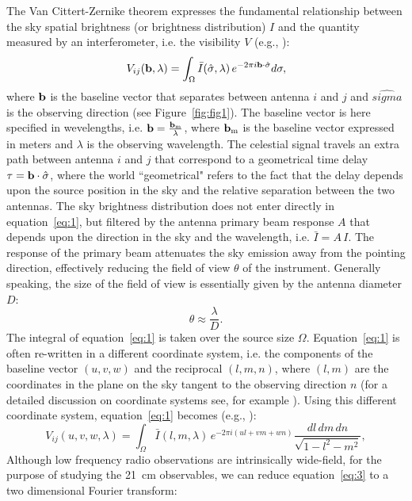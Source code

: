The Van Cittert-Zernike theorem expresses the fundamental relationship between the sky spatial brightness (or brightness distribution) $I$ and the quantity measured by an interferometer, i.e. the visibility $V$ (e.g., \cite{TMS}):
\begin{equation}
V_{ij} ({\bf b}, \lambda) = \int_\Omega {\bar I} (\hat{\sigma}, \lambda) \, e^{-2 \pi i {\bf b} \cdot {\hat \sigma}} d {\bf \sigma},
\label{eq:1}
\end{equation}
where ${\bf b}$ is the baseline vector that separates between antenna $i$ and $j$ and $\hat{sigma}$ is the observing direction (see Figure~\ref{fig:fig1}). The baseline vector is here specified in wevelengths, i.e. ${\bf b} = \frac{{\bf b_{\rm m}}}{\lambda}$, where ${\bf b_{\rm m}}$ is the baseline vector expressed in meters and $\lambda$ is the observing wavelength. The celestial signal travels an extra path between antenna $i$ and $j$ that correspond to a geometrical time delay $\tau = {\bf b} \cdot {\hat \sigma}$, where the world ``geometrical" refers to the fact that the delay depends upon the source position in the sky and the relative separation between the two antennas.
The sky brightness distribution does not enter directly in equation~\ref{eq:1}, but filtered by the antenna primary beam response $A$ that depends upon the direction in the sky and the wavelength, i.e. ${\bar I} = A  \, I$. The response of the primary beam attenuates the sky emission away from the pointing direction, effectively reducing the field of view $\theta$ of the instrument. Generally speaking, the size of the field of view is essentially given by the antenna diameter $D$: 
\begin{equation}
\theta \approx \frac{\lambda}{D}.
\label{eq:2}
\end{equation}
The integral of equation~\ref{eq:1} is taken over the source size $\Omega$. Equation~\ref{eq:1} is often re-written in a different coordinate system, i.e. the components of the baseline vector $(u,v,w)$ and the reciprocal $(l,m,n)$, where $(l,m)$ are the coordinates in the plane on the sky tangent to the observing direction $n$ (for a detailed discussion on coordinate systems see, for example \cite{TMS}). Using this different coordinate system, equation~\ref{eq:1} becomes (e.g., \cite{TMS}):
\begin{equation}
V_{ij} (u,v,w, \lambda) = \int_\Omega {\bar I} (l, m, \lambda) \, e^{-2 \pi i (ul + vm + wn)} \frac {dl \, dm \, dn}{\sqrt{1 - l^2 - m^2}},
\label{eq:3}
\end{equation}
Although low frequency radio observations are intrinsically wide-field, for the purpose of studying the 21~cm observables, we can reduce equation~\ref{eq:3} to a two dimensional Fourier transform:
